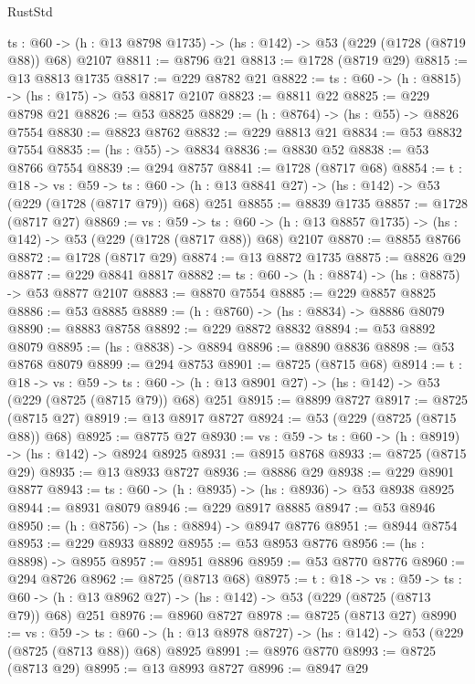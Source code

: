 \begin{lexlean}{RustStd}
\begin{coremodule}
  {ts : @60} -> (h : @13 @8798 @1735) -> (hs : @142) -> @53 (@229 (@1728 (@8719 @88)) @68) @2107
@8811 := @8796 @21
@8813 := @1728 (@8719 @29)
@8815 := @13 @8813 @1735
@8817 := @229 @8782 @21
@8822 := {ts : @60} -> (h : @8815) -> (hs : @175) -> @53 @8817 @2107
@8823 := @8811 @22
@8825 := @229 @8798 @21
@8826 := @53 @8825
@8829 := (h : @8764) -> (hs : @55) -> @8826 @7554
@8830 := @8823 @8762
@8832 := @229 @8813 @21
@8834 := @53 @8832 @7554
@8835 := (hs : @55) -> @8834
@8836 := @8830 @52
@8838 := @53 @8766 @7554
@8839 := @294 @8757
@8841 := @1728 (@8717 @68)
@8854 := {t : @18} ->
  {vs : @59} ->
  {ts : @60} -> (h : @13 @8841 @27) -> (hs : @142) -> @53 (@229 (@1728 (@8717 @79)) @68) @251
@8855 := @8839 @1735
@8857 := @1728 (@8717 @27)
@8869 := {vs : @59} ->
  {ts : @60} -> (h : @13 @8857 @1735) -> (hs : @142) -> @53 (@229 (@1728 (@8717 @88)) @68) @2107
@8870 := @8855 @8766
@8872 := @1728 (@8717 @29)
@8874 := @13 @8872 @1735
@8875 := @8826 @29
@8877 := @229 @8841 @8817
@8882 := {ts : @60} -> (h : @8874) -> (hs : @8875) -> @53 @8877 @2107
@8883 := @8870 @7554
@8885 := @229 @8857 @8825
@8886 := @53 @8885
@8889 := (h : @8760) -> (hs : @8834) -> @8886 @8079
@8890 := @8883 @8758
@8892 := @229 @8872 @8832
@8894 := @53 @8892 @8079
@8895 := (hs : @8838) -> @8894
@8896 := @8890 @8836
@8898 := @53 @8768 @8079
@8899 := @294 @8753
@8901 := @8725 (@8715 @68)
@8914 := {t : @18} ->
  {vs : @59} ->
  {ts : @60} -> (h : @13 @8901 @27) -> (hs : @142) -> @53 (@229 (@8725 (@8715 @79)) @68) @251
@8915 := @8899 @8727
@8917 := @8725 (@8715 @27)
@8919 := @13 @8917 @8727
@8924 := @53 (@229 (@8725 (@8715 @88)) @68)
@8925 := @8775 @27
@8930 := {vs : @59} -> {ts : @60} -> (h : @8919) -> (hs : @142) -> @8924 @8925
@8931 := @8915 @8768
@8933 := @8725 (@8715 @29)
@8935 := @13 @8933 @8727
@8936 := @8886 @29
@8938 := @229 @8901 @8877
@8943 := {ts : @60} -> (h : @8935) -> (hs : @8936) -> @53 @8938 @8925
@8944 := @8931 @8079
@8946 := @229 @8917 @8885
@8947 := @53 @8946
@8950 := (h : @8756) -> (hs : @8894) -> @8947 @8776
@8951 := @8944 @8754
@8953 := @229 @8933 @8892
@8955 := @53 @8953 @8776
@8956 := (hs : @8898) -> @8955
@8957 := @8951 @8896
@8959 := @53 @8770 @8776
@8960 := @294 @8726
@8962 := @8725 (@8713 @68)
@8975 := {t : @18} ->
  {vs : @59} ->
  {ts : @60} -> (h : @13 @8962 @27) -> (hs : @142) -> @53 (@229 (@8725 (@8713 @79)) @68) @251
@8976 := @8960 @8727
@8978 := @8725 (@8713 @27)
@8990 := {vs : @59} ->
  {ts : @60} -> (h : @13 @8978 @8727) -> (hs : @142) -> @53 (@229 (@8725 (@8713 @88)) @68) @8925
@8991 := @8976 @8770
@8993 := @8725 (@8713 @29)
@8995 := @13 @8993 @8727
@8996 := @8947 @29

\end{coremodule}
\end{lexlean}
